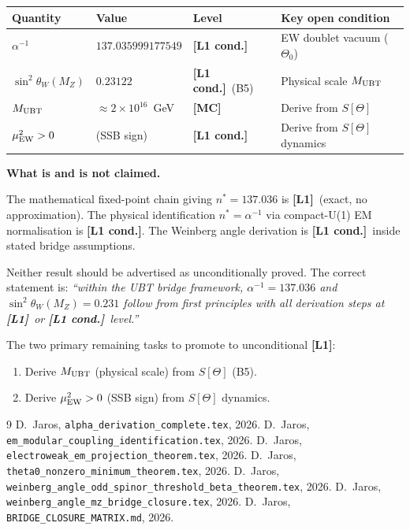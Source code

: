 \documentclass[12pt,a4paper]{article}
\theoremstyle{remark}\newtheorem{remark}[theorem]{Remark}
\newcommand{\Lo}{\textbf{[L1]}}
\newcommand{\Lc}{\textbf{[L1 cond.]}}
\newcommand{\MC}{\textbf{[MC]}}
\begin{document}
\begin{center}
\renewcommand{\arraystretch}{1.3}
\begin{tabular}{lllp{4.5cm}}
\toprule
Quantity & Value & Level & Key open condition \\
\midrule
$\alpha^{-1}$ & $137.035999177549$ & \Lc & EW doublet vacuum ($\Theta_0$) \\
$\sin^2\theta_W(M_Z)$ & $0.23122$ & \Lc\ (B5) & Physical scale $M_{\rm UBT}$ \\
$M_{\rm UBT}$ & $\approx 2\times10^{16}$~GeV & \MC & Derive from $S[\Theta]$ \\
$\mu^2_{\rm EW}>0$ & (SSB sign) & \Lc & Derive from $S[\Theta]$ dynamics \\
\bottomrule
\end{tabular}
\end{center}

\begin{insightbox}
\textbf{What is and is not claimed.}

The mathematical fixed-point chain giving $n^*=137.036$ is \Lo\ (exact,
no approximation). The physical identification $n^*=\alpha^{-1}$ via
compact-U(1) EM normalisation is \Lc. The Weinberg angle derivation is
\Lc\ inside stated bridge assumptions.

Neither result should be advertised as unconditionally proved.
The correct statement is: \emph{``within the UBT bridge framework,
$\alpha^{-1}=137.036$ and $\sin^2\theta_W(M_Z)=0.231$ follow from
first principles with all derivation steps at \Lo\ or \Lc\ level.''}

The two primary remaining tasks to promote to unconditional \Lo:
\begin{enumerate}
\item Derive $M_{\rm UBT}$ (physical scale) from $S[\Theta]$ (B5).
\item Derive $\mu^2_{\rm EW}>0$ (SSB sign) from $S[\Theta]$ dynamics.
\end{enumerate}
\end{insightbox}

\begin{thebibliography}{9}
  D.~Jaros, \texttt{alpha\_derivation\_complete.tex}, 2026.
  D.~Jaros, \texttt{em\_modular\_coupling\_identification.tex}, 2026.
  D.~Jaros, \texttt{electroweak\_em\_projection\_theorem.tex}, 2026.
  D.~Jaros, \texttt{theta0\_nonzero\_minimum\_theorem.tex}, 2026.
  D.~Jaros, \texttt{weinberg\_angle\_odd\_spinor\_threshold\_beta\_theorem.tex}, 2026.
  D.~Jaros, \texttt{weinberg\_angle\_mz\_bridge\_closure.tex}, 2026.
  D.~Jaros, \texttt{BRIDGE\_CLOSURE\_MATRIX.md}, 2026.
\end{thebibliography}

\ifdefined\INCLUDEMODE\else
\end{document}
